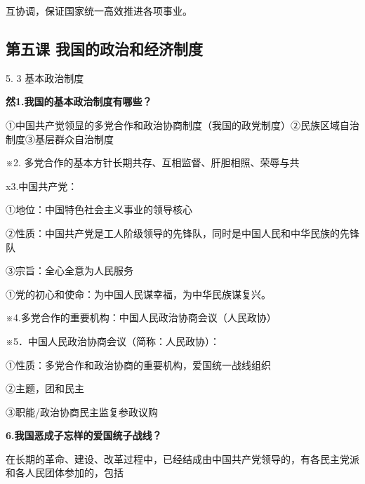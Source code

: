 \documentclass[lang=cn,11pt]{elegantbook}
\newcommand{\daofasym}[1]{{\daofasymbolfont #1}}
\newcommand{\daofasym}[1]{#1}
\begin{document}
互协调，保证国家统一高效推进各项事业。\par

\subsection*{第五课 我国的政治和经济制度}

5. 3 基本政治制度\par

\textbf{然1.我国的基本政治制度有哪些？}\par

\daofasym{①}中国共产觉领显的多党合作和政治协商制度（我国的政党制度）\daofasym{②}民族区域自治制度\daofasym{③}基层群众自治制度\par

※2. 多党合作的基本方针长期共存、互相监督、肝胆相照、荣辱与共\par

x3.中国共产党：\par

\daofasym{①}地位：中国特色社会主义事业的领导核心\par

\daofasym{②}性质：中国共产党是工人阶级领导的先锋队，同时是中国人民和中华民族的先锋队\par

\daofasym{③}宗旨：全心全意为人民服务\par

\daofasym{①}党的初心和使命：为中国人民谋幸福，为中华民族谋复兴。\par

※4.多党合作的重要机构：中国人民政治协商会议（人民政协）\par

※5．中国人民政治协商会议（简称：人民政协）：\par

\daofasym{①}性质：多党合作和政治协商的重要机构，爱国统一战线组织\par

\daofasym{②}主题，团和民主\par

\daofasym{③}职能/政治协商民主监复参政议购\par

\textbf{6.我国恶成子忘样的爱国统子战线？}\par

在长期的革命、建设、改革过程中，已经结成由中国共产党领导的，有各民主党派和各人民团体参加的，包括\par
\end{document}
